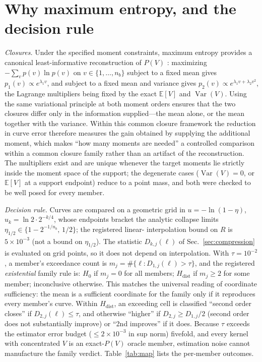\documentclass[aps,pre,twocolumn,superscriptaddress,floatfix,longbibliography]{revtex4-2}
\begin{document}
\section{Why maximum entropy, and the decision rule}
\label{app:protocol}

\emph{Closures.} Under the specified moment constraints, maximum entropy provides a
canonical least-informative reconstruction of $P(V)$ \cite{Jaynes1957,Cover2006}: maximizing
$-\sum_v p(v)\ln p(v)$ on $v\in\{1,\dots,n_b\}$ subject to a fixed mean gives
$p_1(v)\propto e^{\lambda_1 v}$, and subject to a fixed mean and variance gives
$p_2(v)\propto e^{\lambda_1 v+\lambda_2 v^2}$, the Lagrange multipliers being fixed
by the exact $\mathbb{E}[V]$ and $\operatorname{Var}(V)$. Using the same variational
principle at both moment orders ensures that the two closures differ only in the
information supplied---the mean alone, or the mean together with the variance. Within
this common closure framework the reduction in curve error therefore measures the
gain obtained by supplying the additional moment, which makes ``how many moments are
needed'' a controlled comparison within a common closure family rather than an
artifact of the reconstruction. The multipliers exist and are
unique whenever the target moments lie strictly inside the moment space of the
support; the degenerate cases ($\operatorname{Var}(V)=0$, or $\mathbb{E}[V]$ at a
support endpoint) reduce to a point mass, and both were checked to be well posed for
every member.

\emph{Decision rule.} Curves are compared on a geometric grid in
$u=-\ln(1-\eta)$, $u_k=\ln 2\cdot 2^{-k/4}$, whose endpoints bracket the analytic
collapse limits $\eta_{1/2}\in\{1-2^{-1/n_b},\,1/2\}$; the registered linear-%
interpolation bound on $R$ is $5\times10^{-3}$ (not a bound on $\eta_{1/2}$). The
statistic $D_{k,j}(\ell)$ of Sec.~\ref{sec:compression} is evaluated on grid points,
so it does not depend on interpolation. With $\tau=10^{-2}$, a member's exceedance count is
$m_j=\#\{\ell:D_{1,j}(\ell)>\tau\}$, and the registered \emph{existential} family
rule is: $H_0$ if $m_j=0$ for all members; $H_{\mathrm{dist}}$ if $m_j\ge2$ for some
member; inconclusive otherwise. This matches the universal reading of coordinate
sufficiency: the mean is a sufficient coordinate for the family only if it
reproduces every member's curve. Within $H_{\mathrm{dist}}$, an exceeding cell is
classified ``second order closes'' if $D_{2,j}(\ell)\le\tau$, and otherwise ``higher''
if $D_{2,j}\ge D_{1,j}/2$ (second order does not substantially improve) or
``2nd improves'' if it does. Because $\tau$ exceeds the estimator error budget
($\le2\times10^{-3}$ in sup norm) fivefold, and every kernel with concentrated $V$ is
an exact-$P(V)$ oracle member, estimation noise cannot manufacture the family
verdict. Table~\ref{tab:map} lists the per-member outcomes.
\end{document}
